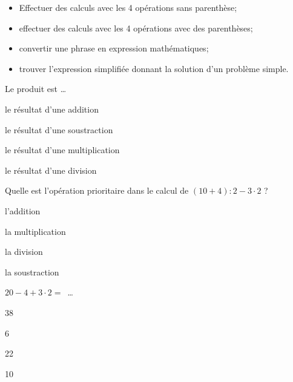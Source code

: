 \begin{acquis}
\begin{itemize}
\item Effectuer des calculs avec les 4 opérations sans parenthèse;
\item effectuer des calculs avec les 4 opérations avec des parenthèses;
\item convertir une phrase en expression mathématiques;
\item trouver l'expression simplifiée donnant la solution d'un problème simple.
\end{itemize}
\end{acquis}


\begin{QCM}
  \begin{GroupeQCM}
    \begin{exercice}
      Le produit est \ldots
      \begin{ChoixQCM}{4}
      \item le résultat d'une addition
      \item le résultat d'une soustraction
      \item le résultat d'une multiplication
      \item le résultat d'une division
      \end{ChoixQCM}
\begin{corrige}
   \end{corrige}
    \end{exercice}

\begin{exercice}
      Quelle est l'opération prioritaire dans le calcul de $(10 + 4) : 2 - 3 \cdot 2$ ?
      \begin{ChoixQCM}{4}
      \item l'addition
      \item la multiplication
      \item la division
      \item la soustraction
      \end{ChoixQCM}
\begin{corrige}
   \end{corrige}
    \end{exercice}
    
\begin{exercice}
      $20 - 4 + 3 \cdot 2 =$ \ldots
      \begin{ChoixQCM}{4}
      \item 38
      \item 6
      \item 22
      \item 10
      \end{ChoixQCM}
\begin{corrige}
   \end{corrige}
    \end{exercice}
    

\end{GroupeQCM}
\end{QCM}
